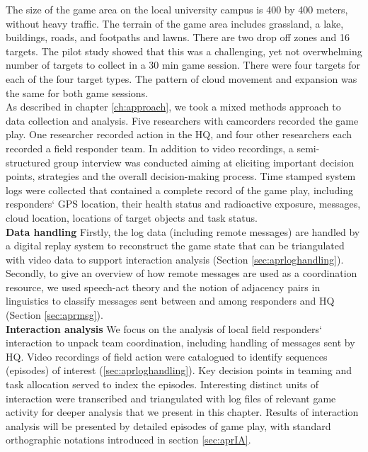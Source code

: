 The size of the game area on the local university campus is 400 by 400 meters, without heavy traffic. The terrain of the game area includes grassland, a lake, buildings, roads, and footpaths and lawns. There are two drop off zones and 16 targets. The pilot study showed that this was a challenging, yet not overwhelming number of targets to collect in a 30 min game session. There were four targets for each of the four target types. The pattern of cloud movement and expansion was the same for both game sessions.\\

As described in chapter \ref{ch:approach}, we took a mixed methods approach to data collection and analysis. Five researchers with camcorders recorded the game play. One researcher recorded action in the HQ, and four other researchers each recorded a field responder team. In addition to video recordings, a semi-structured group interview was conducted aiming at eliciting important decision points, strategies and the overall decision-making process. Time stamped system logs were collected that contained a complete record of the game play, including responders` GPS location, their health status and radioactive exposure, messages, cloud location, locations of target objects and task status. \\

\textbf{Data handling} Firstly, the log data (including remote messages) are handled by a digital replay system to reconstruct the game state that can be triangulated with video data to support interaction analysis (Section \ref{sec:aprloghandling}). Secondly, to give an overview of how remote messages are used as a coordination resource, we used speech-act theory and the notion of adjacency pairs in linguistics to classify messages sent between and among responders and HQ (Section \ref{sec:aprmsg}).\\

\textbf{Interaction analysis} We focus on the analysis of local field responders` interaction to unpack team coordination, including handling of messages sent by HQ. Video recordings of field action were catalogued to identify sequences (episodes) of interest (\ref{sec:aprloghandling}). Key decision points in teaming and task allocation served to index the episodes. Interesting distinct units of interaction were transcribed and triangulated with log files of relevant game activity for deeper analysis that we present in this chapter. Results of interaction analysis will be presented by detailed episodes of game play, with standard orthographic notations introduced in section \ref{sec:aprIA}. \\


